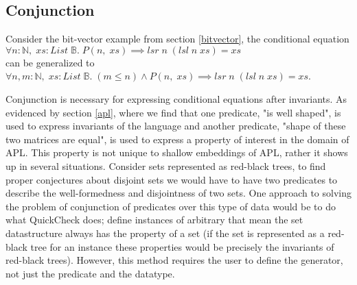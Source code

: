 \subsection{Conjunction}\label{conjunction}
Consider the bit-vector example from section
\ref{bitvector}, the conditional equation
\\$\forall n:\mathbb{N},\;xs:List\;\mathbb{B}.\;P(n,\;xs)\implies lsr\;n\;(lsl\;n\;xs)=xs$\\
can be generalized to
\\$\forall n,m:\mathbb{N},\;xs:List\;\mathbb{B}.\;(m\leq n)\wedge P(n,\;xs)\implies lsr\;n\;(lsl\;n\;xs)=xs$.

Conjunction is necessary for expressing conditional equations after invariants.
As evidenced by section \ref{apl}, where we find that one predicate, "is well shaped",
is used to express invariants of the language and another predicate, "shape of these two matrices
are equal", is used to express a property of interest in the domain of APL.
This property is not unique to shallow embeddings of APL, rather it shows up in several situations.
Consider sets represented as red-black trees, to find proper conjectures about
disjoint sets we would have to have two predicates to describe the well-formedness
and disjointness of two sets. One approach to solving the problem of conjunction of predicates over this
type of data would be to do what QuickCheck does\cite{Claessen2000}; define instances
of arbitrary that mean the set datastructure always has the property of a set (if the set is represented
as a red-black tree for an instance these properties would be precisely the invariants of red-black trees). 
However, this method requires the user to define the generator, not just the predicate and the datatype.

